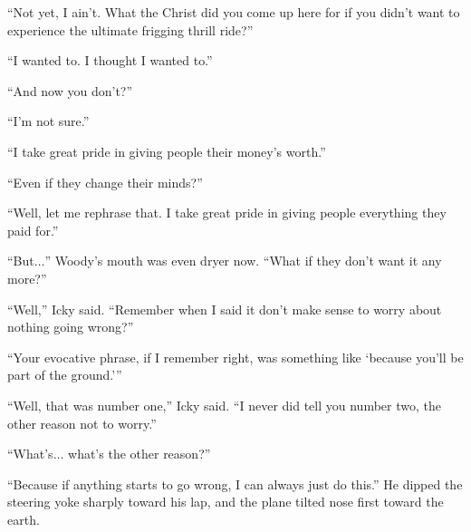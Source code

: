 ``Not yet, I ain't. What the Christ did you come up here for if you didn't want to experience the ultimate frigging thrill ride?''

``I wanted to. I thought I wanted to.''

``And now you don't?''

``I'm not sure.''

``I take great pride in giving people their money's worth.''

``Even if they change their minds?''

``Well, let me rephrase that. I take great pride in giving people everything they paid for.''

``But$\ldots$'' Woody's mouth was even dryer now. ``What if they don't want it any more?''

``Well,'' Icky said. ``Remember when I said it don't make sense to worry about nothing going wrong?''

``Your evocative phrase, if I remember right, was something like `because you'll be part of the ground.'''

``Well, that was number one,'' Icky said. ``I never did tell you number two, the other reason not to worry.''

``What's$\ldots$ what's the other reason?''

``Because if anything starts to go wrong, I can always just do this.'' He dipped the steering yoke sharply toward his lap, and the plane tilted nose first toward the earth.
